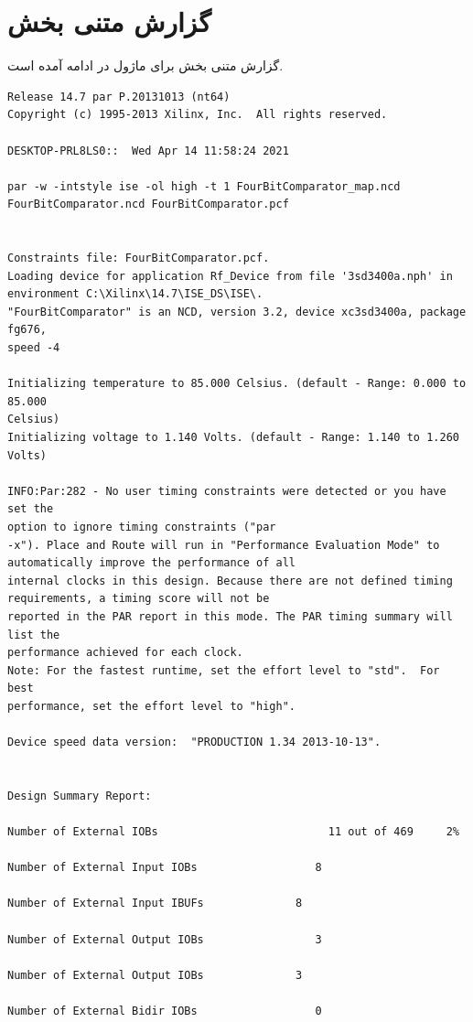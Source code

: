 \documentclass[fleqn]{article}
\begin{document}
\section{گزارش متنی بخش }
گزارش متنی بخش  برای ماژول  در ادامه 
آمده است.
\begin{latin}
\begin{lstlisting}[basicstyle=\tiny]
Release 14.7 par P.20131013 (nt64)
Copyright (c) 1995-2013 Xilinx, Inc.  All rights reserved.

DESKTOP-PRL8LS0::  Wed Apr 14 11:58:24 2021

par -w -intstyle ise -ol high -t 1 FourBitComparator_map.ncd
FourBitComparator.ncd FourBitComparator.pcf 


Constraints file: FourBitComparator.pcf.
Loading device for application Rf_Device from file '3sd3400a.nph' in 
environment C:\Xilinx\14.7\ISE_DS\ISE\.
"FourBitComparator" is an NCD, version 3.2, device xc3sd3400a, package fg676, 
speed -4

Initializing temperature to 85.000 Celsius. (default - Range: 0.000 to 85.000 
Celsius)
Initializing voltage to 1.140 Volts. (default - Range: 1.140 to 1.260 Volts)

INFO:Par:282 - No user timing constraints were detected or you have set the 
option to ignore timing constraints ("par
-x"). Place and Route will run in "Performance Evaluation Mode" to 
automatically improve the performance of all
internal clocks in this design. Because there are not defined timing 
requirements, a timing score will not be
reported in the PAR report in this mode. The PAR timing summary will list the 
performance achieved for each clock.
Note: For the fastest runtime, set the effort level to "std".  For best 
performance, set the effort level to "high".

Device speed data version:  "PRODUCTION 1.34 2013-10-13".


Design Summary Report:

Number of External IOBs                          11 out of 469     2%

Number of External Input IOBs                  8

Number of External Input IBUFs              8

Number of External Output IOBs                 3

Number of External Output IOBs              3

Number of External Bidir IOBs                  0



\end{lstlisting}
\end{latin}
\end{document}
